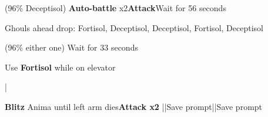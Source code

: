 \begin{mainlist}
	\item {} (96\% Deceptisol) \textbf{Auto-battle} x2\to\textbf{Attack}\to Wait for 56 seconds
	\item Ghouls ahead drop: Fortisol, Deceptisol, Deceptisol, Fortisol, Deceptisol
	\item {} (96\% either one) Wait for 33 seconds
	\item Use \textbf{Fortisol} while on elevator
	\item {}|\skip
	\item {} \textbf{Blitz} Anima until left arm dies\to \textbf{Attack x2} ||Save prompt||Save prompt
\end{mainlist}
